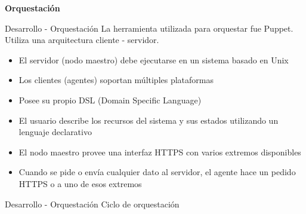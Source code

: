 \begin{frame}
    \Huge
    \centering
    \textbf{Orquestación}

\end{frame}

\begin{frame}{Desarrollo - Orquestación}
    \vspace{-1.5cm}
    La herramienta utilizada para orquestar fue Puppet.
    \\
    Utiliza una arquitectura cliente - servidor.  
    \begin{itemize}
        \item El servidor (nodo maestro) debe ejecutarse en un sistema basado en Unix
        \item Los clientes (agentes) soportan múltiples plataformas
        \item Posee su propio DSL (Domain Specific Language)
        \item El usuario describe los recursos del sistema y sus estados utilizando un lenguaje declarativo  
        \item El nodo maestro provee una interfaz HTTPS con varios extremos disponibles
        \item Cuando se pide o envía cualquier dato al servidor, el agente hace un pedido HTTPS o a uno de esos extremos
    \end{itemize}

\end{frame}


\begin{frame}{Desarrollo - Orquestación}
    \vspace{0cm} {Ciclo de orquestación}
    \vspace{0cm}
        \begin{figure}[ht]
           \centering
        \end{figure}

\end{frame}

